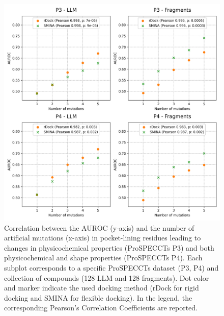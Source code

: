 \begin{figure}[htbp]
  \centering
  \includegraphics[width=0.7\linewidth]{figures/PocketVec/Supplementary/FigS9.png}
  \caption{
  Correlation between the AUROC (y-axis) and the number of artificial mutations (x-axis) in pocket-lining residues leading to changes in physicochemical properties (ProSPECCTs P3) and both physicochemical and shape properties (ProSPECCTs P4). Each subplot corresponds to a specific ProSPECCTs dataset (P3, P4) and collection of compounds (128 LLM and 128 fragments). Dot color and marker indicate the used docking method (rDock for rigid docking and SMINA for flexible docking). In the legend, the corresponding Pearson’s Correlation Coefficients are reported. 
  }
  \label{PocketVec_FigS9}
\end{figure}

